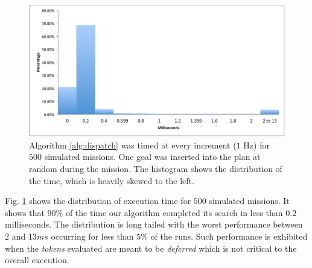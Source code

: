 \begin{figure}[!b]
  \centering
  \includegraphics[width=\columnwidth]{figs/HistogramAlg1}
  \caption{\small Algorithm \ref{alg:dispatch} was timed at every
    increment ($1$ Hz) for $500$ simulated missions. One goal was
    inserted into the plan at random during the mission. The histogram
    shows the distribution of the time, which is heavily skewed to the
    left.}
  \label{fig:histogram}
\end{figure}

Fig. \ref{fig:histogram} shows the distribution of execution time for
$500$ simulated missions. It shows that $90\%$ of the time our
algorithm completed its search in less than $0.2$ milliseconds. The
distribution is long tailed with the worst performance between $2$ and
$13ms$ occurring for less than $5\%$ of the runs. Such performance is
exhibited when the {\em tokens} evaluated are meant to be {\em
  deferred} which is not critical to the overall execution.



